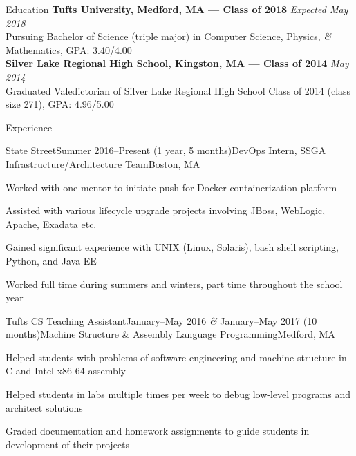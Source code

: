 \documentclass{resume}
\begin{document}
  \begin{rSection}{Education}
    {\bf Tufts University, Medford, MA --- Class of 2018} \hfill {\em Expected May 2018} \\ 
    { Pursuing Bachelor of Science (triple major) in Computer Science, Physics, \textit{\&} Mathematics, GPA: 3.40/4.00 }\\
    {\bf Silver Lake Regional High School, Kingston, MA --- Class of 2014} \hfill {\em May 2014}\\ 
    { Graduated Valedictorian of Silver Lake Regional High School Class of 2014 (class size 271), GPA: 4.96/5.00 }
  \end{rSection}

  \begin{rSection}{Experience}
    \begin{rSubsection}{State Street}{Summer 2016--Present (1 year, 5 months)}{DevOps Intern, SSGA Infrastructure/Architecture Team}{Boston, MA}
    \item Worked with one mentor to initiate push for Docker containerization platform
    \item Assisted with various lifecycle upgrade projects involving JBoss, WebLogic, Apache, Exadata etc.
    \item Gained significant experience with UNIX (Linux, Solaris), bash shell scripting, Python, and Java EE
    \item Worked full time during summers and winters, part time throughout the school year
    \end{rSubsection}

    \begin{rSubsection}{Tufts CS Teaching Assistant}{January--May 2016 \textit{\&} January--May 2017 (10 months)}{Machine Structure \& Assembly Language Programming}{Medford, MA}
    \item Helped students with problems of software engineering and machine structure in C and Intel x86-64 assembly
    \item Helped students in labs multiple times per week to debug low-level programs and architect solutions
    \item Graded documentation and homework assignments to guide students in development of their projects
    \end{rSubsection}
  \end{rSection}
\end{document}

